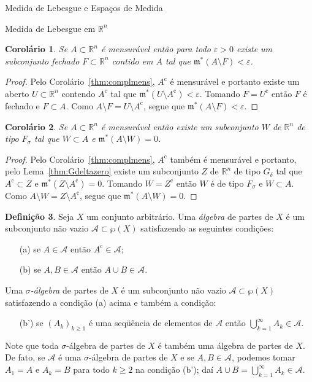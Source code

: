\documentclass[oneside,final,11pt]{amsbook}
\newcommand{\R}{\mathds R}
\newcommand{\leb}{\mathfrak m}
\newcommand{\compl}{\mathrm c}
\theoremstyle{remark}\newtheorem{exercise}{Exercício}[chapter]
\theoremstyle{remark}\newtheorem{*exercise}[exercise]{\hbox to 0pt{\hskip 0pt minus 1fil*}Exercício}
\theoremstyle{definition}\newtheorem{exdefin}{Definição}[chapter]
\theoremstyle{plain}\newtheorem{teo}{Teorema}[section]
\theoremstyle{plain}\newtheorem{lem}[teo]{Lema}
\theoremstyle{plain}\newtheorem{prop}[teo]{Proposição}
\theoremstyle{plain}\newtheorem{cor}[teo]{Corolário}
\theoremstyle{definition}\newtheorem{defin}[teo]{Definição}
\theoremstyle{remark}\newtheorem{rem}[teo]{Observação}
\theoremstyle{definition}\newtheorem{notation}[teo]{Notação}
\theoremstyle{definition}\newtheorem{convention}[teo]{Convenção}
\theoremstyle{definition}\newtheorem{example}[teo]{Exemplo}
\numberwithin{section}{chapter}
\numberwithin{equation}{section}
\begin{document}
\begin{chapter}{Medida de Lebesgue e Espaços de Medida}
\begin{section}[Medida de Lebesgue em $\R^n$]{Medida de Lebesgue em ${\R^n}$}
\begin{cor}\label{thm:innerfechado}
Se $A\subset\R^n$ é mensurável então para todo $\varepsilon>0$ existe um subconjunto
fechado $F\subset\R^n$ contido em $A$ tal que $\leb^*(A\setminus F)<\varepsilon$.
\end{cor}
\begin{proof}
Pelo Corolário~\ref{thm:complmens}, $A^\compl$ é mensurável e portanto existe um aberto
$U\subset\R^n$ contendo $A^\compl$ tal que $\leb^*(U\setminus A^\compl)<\varepsilon.$
Tomando $F=U^\compl$ então $F$ é fechado e $F\subset A$. Como $A\setminus F=U\setminus A^\compl$,
segue que $\leb^*(A\setminus F)<\varepsilon$.
\end{proof}

\begin{cor}\label{thm:innerFsigma}
Se $A\subset\R^n$ é mensurável então existe um subconjunto $W$ de $\R^n$ de tipo $F_\sigma$ tal que
$W\subset A$ e $\leb^*(A\setminus W)=0$.
\end{cor}
\begin{proof}
Pelo Corolário~\ref{thm:complmens}, $A^\compl$ também é mensurável e portanto, pelo Lema~\ref{thm:Gdeltazero}
existe um subconjunto $Z$ de $\R^n$ de tipo $G_\delta$ tal que $A^\compl\subset Z$ e $\leb^*(Z\setminus A^\compl)=0$.
Tomando $W=Z^\compl$ então $W$ é de tipo $F_\sigma$ e $W\subset A$. Como $A\setminus W=Z\setminus A^\compl$,
segue que $\leb^*(A\setminus W)=0$.
\end{proof}

\begin{defin}\label{thm:defalgsigmaalg}
Seja $X$ um conjunto arbitrário. Uma {\em álgebra\/}
de partes de $X$ é um subconjunto não vazio $\mathcal A\subset\wp(X)$ satisfazendo as seguintes condições:
\begin{itemize}
\item[(a)] se $A\in\mathcal A$ então $A^\compl\in\mathcal A$;
\item[(b)] se $A,B\in\mathcal A$ então $A\cup B\in\mathcal A$.
\end{itemize}
Uma {\em $\sigma$-álgebra\/}
de partes de $X$ é um subconjunto não vazio $\mathcal A\subset\wp(X)$ satisfazendo a condição (a) acima
e também a condição:
\begin{itemize}
\item[(b')] se $(A_k)_{k\ge1}$ é uma seqüência de elementos de $\mathcal A$
então $\bigcup_{k=1}^\infty A_k\in\mathcal A$.
\end{itemize}
\end{defin}
Note que toda $\sigma$-álgebra de partes de $X$ é também uma álgebra de partes de $X$.
De fato, se $\mathcal A$ é uma $\sigma$-álgebra
de partes de $X$ e se $A,B\in\mathcal A$, podemos tomar $A_1=A$ e $A_k=B$ para todo $k\ge2$ na condição (b');
daí $A\cup B=\bigcup_{k=1}^\infty A_k\in\mathcal A$.


\end{section}
\end{chapter}
\end{document}
